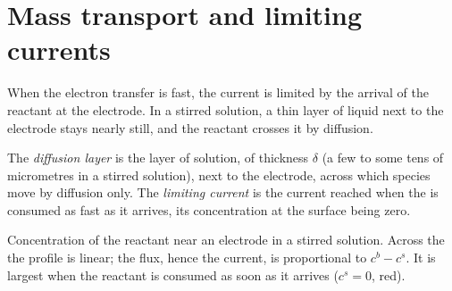 \section{Mass transport and limiting currents}

When the electron transfer is fast, the current is limited by the arrival of
the reactant at the electrode. In a stirred solution, a thin layer of liquid
next to the electrode stays nearly still, and the reactant crosses it by
diffusion.

\begin{definition}\label{def:b2:current-potential-curves:limiting-current}
The \emph{diffusion layer} is the layer of solution,
of thickness $\delta$ (a few to some tens of micrometres in a stirred
solution), next to the electrode, across which species move by diffusion
only. The \emph{limiting current} is the current
reached when the  is consumed as fast as it arrives, its
concentration at the surface being zero.
\end{definition}

\begin{omfigure}

{\small Concentration of the reactant near an electrode in a stirred
solution. Across the  the profile is linear; the flux, hence the
current, is proportional to $c^b - c^s$. It is largest when the reactant is
consumed as soon as it arrives ($c^s = 0$, red).}
\end{omfigure}

